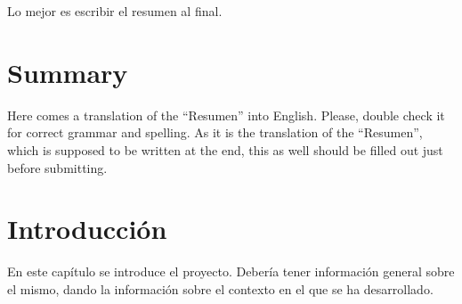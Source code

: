 \documentclass[a4paper, 12pt]{book}
\begin{document}
Lo mejor es escribir el resumen al final.


\chapter*{Summary}

Here comes a translation of the ``Resumen'' into English. 
Please, double check it for correct grammar and spelling.
As it is the translation of the ``Resumen'', which is supposed to be written at the end, this as well should be filled out just before submitting.




\tableofcontents 
\cleardoublepage
\listoffigures %



\cleardoublepage
\chapter{Introducción}
\label{sec:intro} %

En este capítulo se introduce el proyecto.
Debería tener información general sobre el mismo, dando la información sobre el contexto en el que se ha desarrollado.
\end{document}
